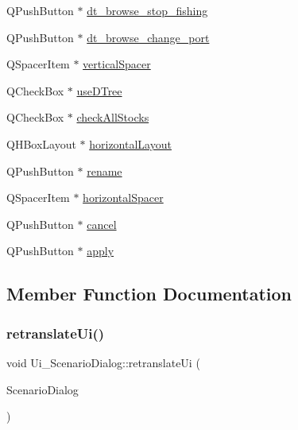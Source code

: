 \begin{DoxyCompactItemize}
Q\+Push\+Button $\ast$ \mbox{\hyperlink{class_ui___scenario_dialog_ad47062dbf96b5d46a798e40613797f82}{dt\+\_\+browse\+\_\+stop\+\_\+fishing}}
\item 
Q\+Push\+Button $\ast$ \mbox{\hyperlink{class_ui___scenario_dialog_a85192a79704153c5bf8607cba5d41ebb}{dt\+\_\+browse\+\_\+change\+\_\+port}}
\item 
Q\+Spacer\+Item $\ast$ \mbox{\hyperlink{class_ui___scenario_dialog_a0268aebc391a00421499440ee8637a67}{vertical\+Spacer}}
\item 
Q\+Check\+Box $\ast$ \mbox{\hyperlink{class_ui___scenario_dialog_adccab236c5dcd7163d47186fc2d498bd}{use\+D\+Tree}}
\item 
Q\+Check\+Box $\ast$ \mbox{\hyperlink{class_ui___scenario_dialog_a9d4f2a898cc0517d78fb6cfab89fa556}{check\+All\+Stocks}}
\item 
Q\+H\+Box\+Layout $\ast$ \mbox{\hyperlink{class_ui___scenario_dialog_af8d604d7d66f6cc4f3af643e5cef3588}{horizontal\+Layout}}
\item 
Q\+Push\+Button $\ast$ \mbox{\hyperlink{class_ui___scenario_dialog_a4b628c2d09190857e98659338e1fae6d}{rename}}
\item 
Q\+Spacer\+Item $\ast$ \mbox{\hyperlink{class_ui___scenario_dialog_a7bb7e2cbff19f40f0f5e25a50e7f6040}{horizontal\+Spacer}}
\item 
Q\+Push\+Button $\ast$ \mbox{\hyperlink{class_ui___scenario_dialog_a793920965eabb1bd949da59864e3ef82}{cancel}}
\item 
Q\+Push\+Button $\ast$ \mbox{\hyperlink{class_ui___scenario_dialog_aec870e26073f81d0d5077ae096f44db3}{apply}}
\end{DoxyCompactItemize}


\subsection{Member Function Documentation}
\mbox{\label{class_ui___scenario_dialog_a9e06170f4d1c54be8730e321e8a515d2}} 
\subsubsection{\texorpdfstring{retranslateUi()}{retranslateUi()}}
{\footnotesize\ttfamily void Ui\+\_\+\+Scenario\+Dialog\+::retranslate\+Ui (\begin{DoxyParamCaption}\item[{Q\+Dialog $\ast$}]{Scenario\+Dialog }\end{DoxyParamCaption})\hspace{0.3cm}{\ttfamily [inline]}}

